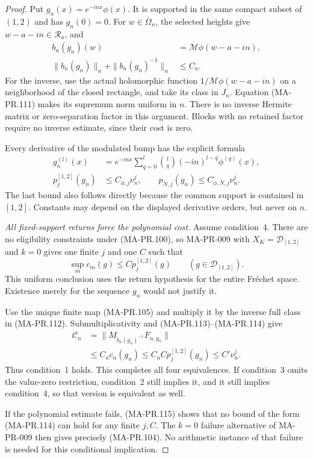 \begin{proof}
Put \(g_n(x)=e^{-inx}\phi(x)\).
It is supported in the same compact subset of
\((1,2)\) and has \(g_n(0)=0\).
For \(w\in\overline\Omega_n\), the selected heights
give \(w-a-in\in\mathcal R_a\), and
\[
 \begin{aligned}
 b_n(g_n)(w)&=\mathcal M\phi(w-a-in),\\
 \|b_n(g_n)\|_n+\|b_n(g_n)^{-1}\|_n&\le C_a .
 \end{aligned}
 \tag{MA-PR.112}
\]
For the inverse, use the actual holomorphic function
\(1/\mathcal M\phi(w-a-in)\) on a neighborhood of
the closed rectangle, and take its class in \(J_n\).
Equation (MA-PR.111) makes its supremum norm
uniform in \(n\).  There is no inverse Hermite
matrix or zero-separation factor in this argument.
Blocks with no retained factor require no inverse
estimate, since their cost is zero.

Every derivative of the modulated bump has the
explicit formula
\[
 \begin{aligned}
 g_n^{(l)}(x)
   &=e^{-inx}\sum_{q=0}^{l}\binom lq
                             (-in)^{l-q}\phi^{(q)}(x),\\
 p_j^{[1,2]}(g_n)&\le C_{\phi,j}\nu_n^j,
       \qquad
 p_{N,j}(g_n)\le C_{\phi,N,j}\nu_n^j .
 \end{aligned}
 \tag{MA-PR.113}
\]
The last bound also follows directly because
the common support is contained in \([1,2]\).
Constants may depend on the displayed derivative
orders, but never on \(n\).

\emph{All fixed-support returns force the polynomial cost.}
Assume condition~4.  There are no eligibility
constraints under (MA-PR.100), so MA-PR-009 with
\(X_K=\mathcal D_{[1,2]}\) and \(k=0\) gives
one finite \(j\) and one \(C\) such that
\[
                     \sup_m c_m(g)\le C p_j^{[1,2]}(g)
                          \qquad(g\in\mathcal D_{[1,2]}).
 \tag{MA-PR.114}
\]
This uniform conclusion uses the return hypothesis
for the entire Fr\'echet space.  Existence merely
for the sequence \(g_n\) would not justify it.

Use the unique finite map (MA-PR.105) and multiply
it by the inverse full class in (MA-PR.112).
Submultiplicativity and (MA-PR.113)--(MA-PR.114) give
\[
 \begin{aligned}
 \mathcal C_n
   &=\|M_{b_n(g_n)^{-1}}F_{n,g_n}\|\\
   &\le C_a c_n(g_n)
    \le C_a C p_j^{[1,2]}(g_n)
    \le C'\nu_n^j .
 \end{aligned}
 \tag{MA-PR.115}
\]
Thus condition~1 holds.  This completes all four
equivalences.  If condition~3 omits the value-zero
restriction, condition~2 still implies it, and it
still implies condition~4, so that version is
equivalent as well.

If the polynomial estimate fails, (MA-PR.115)
shows that no bound of the form (MA-PR.114) can
hold for any finite \(j,C\).
The \(k=0\) failure alternative of MA-PR-009
then gives precisely (MA-PR.104).
No arithmetic instance of that failure is needed
for this conditional implication.
\end{proof}

